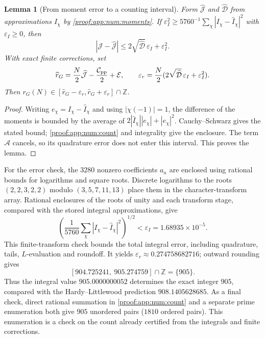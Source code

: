 \documentclass[12pt,a4paper]{amsart}
\numberwithin{equation}{section}
\def\le{\leqslant}
\def\ge{\geqslant}
\theoremstyle{plain}
\newtheorem{lemma}[proposition]{Lemma}
\theoremstyle{definition}
\theoremstyle{remark}
\begin{document}
\begin{lemma}[From moment error to a counting interval]
\label{proof:v9:moment-error-interval}
Form $\widehat{\mathcal J}$ and $\widehat{\mathcal D}$ from approximations
$\widehat I_\chi$ by \eqref{proof:app:num:moments}. If
$\varepsilon_I^2\ge5760^{-1}\sum_\chi|I_\chi-\widehat I_\chi|^2$ with
$\varepsilon_I\ge0$, then
\[
 |\mathcal J-\widehat{\mathcal J}|
 \le2\sqrt{\widehat{\mathcal D}}\,\varepsilon_I+\varepsilon_I^2.
\]
With exact finite corrections, set
\[
 \widehat r_G=\frac N2\widehat{\mathcal J}
                  -\frac{\mathcal C_{\rm pp}}2+\mathcal E,
 \qquad
 \varepsilon_r=\frac N2
       (2\sqrt{\widehat{\mathcal D}}\,\varepsilon_I+\varepsilon_I^2).
\]
Then $r_G(N)\in[\widehat r_G-\varepsilon_r,
\widehat r_G+\varepsilon_r]\cap\mathbb Z$.
\end{lemma}

\begin{proof}
Writing $e_\chi=I_\chi-\widehat I_\chi$ and using $|\chi(-1)|=1$,
the difference of the moments is bounded by the average of
$2|\widehat I_\chi||e_\chi|+|e_\chi|^2$.
Cauchy--Schwarz gives the stated bound; \eqref{proof:app:num:count}
and integrality give the enclosure. The term $\mathcal A$ cancels,
so its quadrature error does not enter this interval.
This proves the lemma.
\end{proof}

For the error check, the $3280$ nonzero coefficients $a_n$ are enclosed
using rational bounds for logarithms and square roots. Discrete logarithms
to the roots $(2,2,3,2,2)$ modulo $(3,5,7,11,13)$ place them in the
character-transform array. Rational enclosures of the roots of unity
and each transform stage, compared with the stored integral approximations,
give
\[
 \left(\frac1{5760}\sum_\chi|I_\chi-\widehat I_\chi|^2\right)^{1/2}
 <\varepsilon_I=1.68935\times10^{-5}.
\]
This finite-transform check bounds the total integral error, including
quadrature, tails, $L$-evaluation and roundoff. It yields
$\varepsilon_r\approx0.274758682716$; outward rounding gives
\begin{equation}\label{proof:app:num:enclosure}
 [904.725241,\ 905.274759]\cap\mathbb Z=\{905\}.
\end{equation}
Thus the integral value $905.0000000052$ determines the exact integer
$905$, compared with the Hardy--Littlewood prediction $908.1405628685$.
As a final check, direct rational summation in \eqref{proof:app:num:count}
and a separate prime enumeration both give $905$ unordered pairs
($1810$ ordered pairs). This enumeration is a check on the count already
certified from the integrals and finite corrections.
\end{document}
